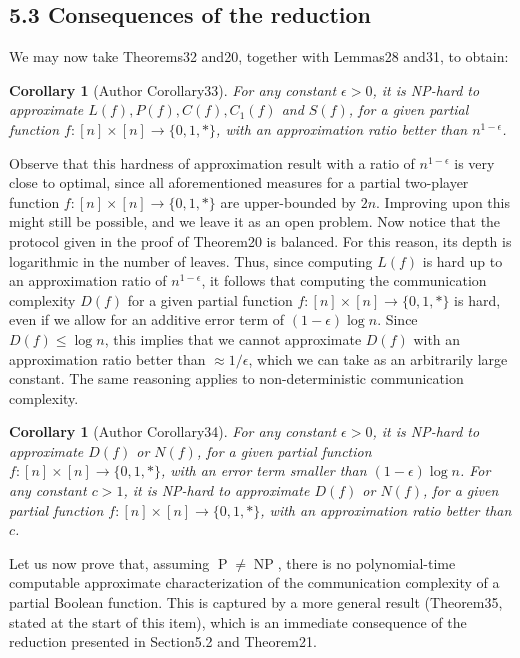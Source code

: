 \documentclass[10pt,a4paper]{article}
\newtheorem{ntcorollary}[nttheorem]{Corollary}
\begin{document}
\subsection*{5.3 Consequences of the reduction}
We may now take Theorems32 and20, together with Lemmas28 and31, to obtain:
\begin{ntcorollary}[Author Corollary33]
For any constant $\epsilon>0$, it is NP-hard to approximate $L(f),P(f),C(f),C_1(f)$ and $S(f)$, for a given partial function $f:[n]\times[n]\to\{0,1,*\}$, with an approximation ratio better than $n^{1-\epsilon}$.
\end{ntcorollary}
Observe that this hardness of approximation result with a ratio of $n^{1-\epsilon}$ is very close to optimal, since all aforementioned measures for a partial two-player function $f:[n]\times[n]\to\{0,1,*\}$ are upper-bounded by $2n$. Improving upon this might still be possible, and we leave it as an open problem.
Now notice that the protocol given in the proof of Theorem20 is balanced. For this reason, its depth is logarithmic in the number of leaves. Thus, since computing $L(f)$ is hard up to an approximation ratio of $n^{1-\epsilon}$, it follows that computing the communication complexity $D(f)$ for a given partial function $f:[n]\times[n]\to\{0,1,*\}$ is hard, even if we allow for an additive error term of $(1-\epsilon)\log n$. Since $D(f)\leq\log n$, this implies that we cannot approximate $D(f)$ with an approximation ratio better than $\approx1/\epsilon$, which we can take as an arbitrarily large constant. The same reasoning applies to non-deterministic communication complexity.
\begin{ntcorollary}[Author Corollary34]
For any constant $\epsilon>0$, it is NP-hard to approximate $D(f)$ or $N(f)$, for a given partial function $f:[n]\times[n]\to\{0,1,*\}$, with an error term smaller than $(1-\epsilon)\log n$. For any constant $c>1$, it is NP-hard to approximate $D(f)$ or $N(f)$, for a given partial function $f:[n]\times[n]\to\{0,1,*\}$, with an approximation ratio better than $c$.
\end{ntcorollary}
Let us now prove that, assuming $\operatorname P\ne\operatorname{NP}$, there is no polynomial-time computable approximate characterization of the communication complexity of a partial Boolean function. This is captured by a more general result (Theorem35, stated at the start of this item), which is an immediate consequence of the reduction presented in Section5.2 and Theorem21.
\end{document}
